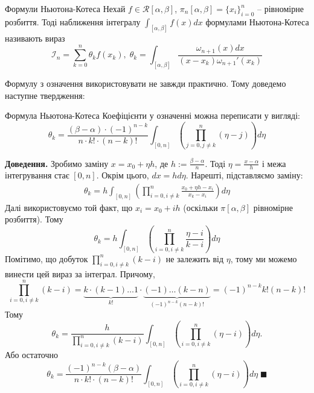 \documentclass[14pt]{extarticle}
\begin{document}
\begin{def*}{Формули Ньютона-Котеса}
    Нехай $f \in \mathcal{R}[\alpha,\beta]$, $\pi_n[\alpha,\beta]=\{x_i\}_{i=0}^n$ -- рівномірне розбиття. Тоді наближення інтегралу $\int_{[\alpha,\beta]}f(x)dx$ формулами Ньютона-Котеса називають вираз
    \[
    \mathcal{I}_n = \sum_{k=0}^n \theta_k f(x_k), \; \theta_k = \int_{[\alpha,\beta]} \frac{\omega_{n+1}(x)dx}{(x-x_k)\omega_{n+1}'(x_k)} 
    \]
\end{def*}

Формулу з означення використовувати не завжди практично. Тому доведемо наступне твердження:

\begin{statement*}{Формула Ньютона-Котеса}
    Коефіцієнти у означенні можна переписати у вигляді:
    \[
    \theta_k = \frac{(\beta-\alpha)\cdot (-1)^{n-k}}{n\cdot k!\cdot (n-k)!}\int_{[0,n]} \left(\prod_{j=0,j\neq k}^n (\eta-j)\right)d\eta
    \]
\end{statement*}

\textbf{Доведення.} Зробимо заміну $x=x_0+\eta h$, де $h := \frac{\beta-\alpha}{n}$. Тоді $\eta=\frac{x-\alpha}{h}$ і межа інтегрування стає $[0,n]$. Окрім цього, $dx=hd\eta$. Нарешті, підставляємо заміну:
\begin{gather}
    \theta_k = h\int_{[0,n]} \left(\prod_{i=0,i\neq k}^n \frac{x_0+\eta h - x_i}{x_k-x_i}\right)d\eta
\end{gather}
Далі використовуємо той факт, що $x_i=x_0+i h$ (оскільки $\pi[\alpha,\beta]$ рівномірне розбиття). Тому
\begin{equation}
    \theta_k = h\int_{[0,n]}\left(\prod_{i=0,i\neq k}^n \frac{\eta-i}{k-i}\right)d\eta
\end{equation}
Помітимо, що добуток $\prod_{i=0,i\neq k}^n (k-i)$ не залежить від $\eta$, тому ми можемо винести цей вираз за інтеграл. Причому, 
\begin{equation}
    \prod_{i=0,i\neq k}^n (k-i) = \underbrace{k\cdot (k-1)\dots 1}_{k!} \cdot \underbrace{(-1) \dots (k-n)}_{(-1)^{n-k}(n-k)!} = (-1)^{n-k}k!(n-k)!
\end{equation}
Тому
\begin{equation}
\theta_k = \frac{h}{\prod_{i=0,i\neq k}^n (k-i)}\int_{[0,n]}\left(\prod_{i=0,i\neq k}^n (\eta-i)\right)d\eta.
\end{equation}
Або остаточно
\begin{equation}
    \theta_k = \frac{(-1)^{n-k}(\beta-\alpha)}{n \cdot k! \cdot (n-k)!} \int_{[0,n]}\left(\prod_{i=0,i\neq k}^n (\eta-i)\right)d\eta \; \blacksquare
\end{equation}
\end{document}
